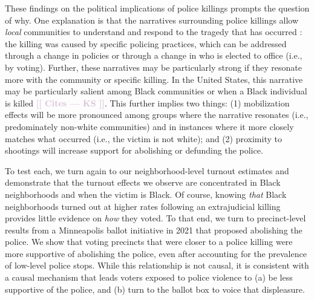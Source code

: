 \documentclass[12pt]{article}
\newcommand{\kscomment}[1]{\textbf{\textcolor{Thistle}{[[ #1 --- KS ]]}}}
\begin{document}
These findings on the political implications of police killings prompts the question of why. 
One explanation is that the narratives surrounding police killings allow \textit{local} communities to understand and respond to the tragedy that has occurred \citep{nuamah2021close,stone1989,walker2019targeted,walker2020mobilized}: the killing was caused by specific policing practices, which can be addressed through a change in policies or through a change in who is elected to office (i.e., by voting). %
Further, these narratives may be particularly strong if they resonate more with the community or specific killing. In the United States, this narrative may be particularly salient among Black communities or when a Black individual is killed \kscomment{Cites}. 
This further implies two things: (1) mobilization effects will be more pronounced among groups where the narrative resonates (i.e., predominately non-white communities) and in instances where it more closely matches what occurred (i.e., the victim is not white); and (2) proximity to shootings will increase support for abolishing or defunding the police. 

To test each, we turn again to our neighborhood-level turnout estimates and demonstrate that the turnout effects we observe are concentrated in Black neighborhoods and when the victim is Black. Of course, knowing \textit{that} Black neighborhoods turned out at higher rates following an extrajudicial killing provides little evidence on \textit{how} they voted. To that end, we turn to precinct-level results from a Minneapolis ballot initiative in 2021 that proposed abolishing the police. We show that voting precincts that were closer to a police killing were more supportive of abolishing the police, even after accounting for the prevalence of low-level police stops. While this relationship is not causal, it is consistent with a causal mechanism that leads voters exposed to police violence to (a) be less supportive of the police, and (b) turn to the ballot box to voice that displeasure.
\end{document}
